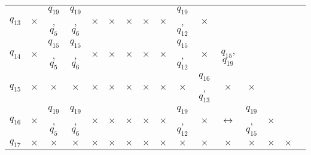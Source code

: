 \documentclass[a4paper,14pt,russian]{extarticle} %
\begin{document}
\begin{sidewaystable}
\begin{tabular}{l c c c c c c c c c c c c c c c }
			\multicolumn{1}{l|}{\({q_{13}}\)}& \multicolumn{1}{c|}{\(\times\)} & \multicolumn{1}{c|}{\({q_{19}}\), \({q_{5}}\)} & \multicolumn{1}{c|}{\({q_{19}}\), \({q_{6}}\)} & \multicolumn{1}{c|}{\(\times\)} & \multicolumn{1}{c|}{\(\times\)} & \multicolumn{1}{c|}{\(\times\)} & \multicolumn{1}{c|}{\(\times\)} & \multicolumn{1}{c|}{\(\times\)} & \multicolumn{1}{c|}{\({q_{19}}\), \({q_{12}}\)} & \multicolumn{1}{c|}{\(\times\)} \\ \cline{2-12}
			\multicolumn{1}{l|}{\({q_{14}}\)}& \multicolumn{1}{c|}{\(\times\)} & \multicolumn{1}{c|}{\({q_{15}}\), \({q_{5}}\)} & \multicolumn{1}{c|}{\({q_{15}}\), \({q_{6}}\)} & \multicolumn{1}{c|}{\(\times\)} & \multicolumn{1}{c|}{\(\times\)} & \multicolumn{1}{c|}{\(\times\)} & \multicolumn{1}{c|}{\(\times\)} & \multicolumn{1}{c|}{\(\times\)} & \multicolumn{1}{c|}{\({q_{15}}\), \({q_{12}}\)} & \multicolumn{1}{c|}{\(\times\)} & \multicolumn{1}{c|}{\({q_{15}}\), \({q_{19}}\)} \\ \cline{2-13}
			\multicolumn{1}{l|}{\({q_{15}}\)}& \multicolumn{1}{c|}{\(\times\)} & \multicolumn{1}{c|}{\(\times\)} & \multicolumn{1}{c|}{\(\times\)} & \multicolumn{1}{c|}{\(\times\)} & \multicolumn{1}{c|}{\(\times\)} & \multicolumn{1}{c|}{\(\times\)} & \multicolumn{1}{c|}{\(\times\)} & \multicolumn{1}{c|}{\(\times\)} & \multicolumn{1}{c|}{\(\times\)} & \multicolumn{1}{c|}{\({q_{16}}\), \({q_{13}}\)} & \multicolumn{1}{c|}{\(\times\)} & \multicolumn{1}{c|}{\(\times\)} \\ \cline{2-14}
			\multicolumn{1}{l|}{\({q_{16}}\)}& \multicolumn{1}{c|}{\(\times\)} & \multicolumn{1}{c|}{\({q_{19}}\), \({q_{5}}\)} & \multicolumn{1}{c|}{\({q_{19}}\), \({q_{6}}\)} & \multicolumn{1}{c|}{\(\times\)} & \multicolumn{1}{c|}{\(\times\)} & \multicolumn{1}{c|}{\(\times\)} & \multicolumn{1}{c|}{\(\times\)} & \multicolumn{1}{c|}{\(\times\)} & \multicolumn{1}{c|}{\({q_{19}}\), \({q_{12}}\)} & \multicolumn{1}{c|}{\(\times\)} & \multicolumn{1}{c|}{\(\leftrightarrow\)} & \multicolumn{1}{c|}{\({q_{19}}\), \({q_{15}}\)} & \multicolumn{1}{c|}{\(\times\)} \\ \cline{2-15}
			\multicolumn{1}{l|}{\({q_{17}}\)}& \multicolumn{1}{c|}{\(\times\)} & \multicolumn{1}{c|}{\(\times\)} & \multicolumn{1}{c|}{\(\times\)} & \multicolumn{1}{c|}{\(\times\)} & \multicolumn{1}{c|}{\(\times\)} & \multicolumn{1}{c|}{\(\times\)} & \multicolumn{1}{c|}{\(\times\)} & \multicolumn{1}{c|}{\(\times\)} & \multicolumn{1}{c|}{\(\times\)} & \multicolumn{1}{c|}{\(\times\)} & \multicolumn{1}{c|}{\(\times\)} & \multicolumn{1}{c|}{\(\times\)} & \multicolumn{1}{c|}{\(\times\)} & \multicolumn{1}{c|}{\(\times\)} \\ \cline{2-16}

\end{tabular}
\end{sidewaystable}
\end{document}
